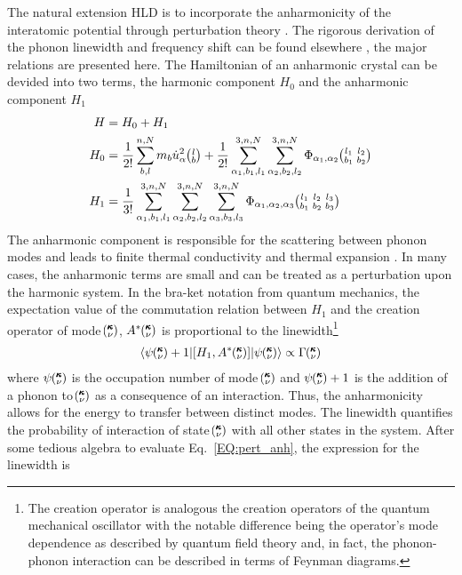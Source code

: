 The natural extension HLD is to incorporate the anharmonicity of the interatomic potential through perturbation theory \cite{turneythesis}. The rigorous derivation of the phonon linewidth and frequency shift can be found elsewhere \cite{PhysRev.128.2589}, the major relations are presented here. The Hamiltonian of an anharmonic crystal can be devided into two terms, the harmonic component $H_0$ and the anharmonic component $H_1$
%
\begin{equation}\label{EQ:H_anh}
\begin{split}
H&=H_0+H_1\\
H_0&=\frac{1}{2!}\sum_{b,l}^{n,N}m_b\dot{u}_\alpha^2 \lb + \frac{1}{2!}\sum_{\alpha_1,b_1,l_1}^{3,n,N}\sum_{\alpha_2,b_2,l_2}^{3,n,N}\Phi_{\alpha_1,\alpha_2} \lblb\\
H_1&=\frac{1}{3!}\sum_{\alpha_1,b_1,l_1}^{3,n,N}\sum_{\alpha_2,b_2,l_2}^{3,n,N}\sum_{\alpha_3,b_3,l_3}^{3,n,N}\Phi_{\alpha_1,\alpha_2,\alpha_3} \lblblb\\
\end{split}
\end{equation}
%
The anharmonic component is responsible for the scattering between phonon modes and leads to finite thermal conductivity and thermal expansion \cite{srivastava1990physics}. In many cases, the anharmonic terms are small and can be treated as a perturbation upon the harmonic system. In the bra-ket notation from quantum mechanics, the expectation value of the commutation relation between $H_1$ and the creation operator of mode $\mspace{-4.0mu}\left(\mspace{-8.0mu} \begin{smallmatrix}&\pmb{\kappa} \\&\nu\end{smallmatrix} \mspace{-3.0mu}\right)$, $A^*\mspace{-4.0mu}\left(\mspace{-8.0mu} \begin{smallmatrix}&\pmb{\kappa} \\&\nu\end{smallmatrix} \mspace{-3.0mu}\right)$ is proportional to the linewidth\footnote{The creation operator is analogous the creation operators of the quantum mechanical oscillator with the notable difference being the operator's mode dependence as described by quantum field theory and, in fact, the phonon-phonon interaction can be described in terms of Feynman diagrams.}
%
\begin{equation}\label{EQ:pert_anh}
\begin{split}
\langle \psi \kv+1 | [H_1,A^*\kv] | \psi \kv\rangle \propto \Gamma \kv
\end{split}
\end{equation}
%
where $\psi \mspace{-4.0mu}\left(\mspace{-8.0mu} \begin{smallmatrix}&\pmb{\kappa} \\&\nu\end{smallmatrix} \mspace{-3.0mu}\right)$ is the occupation number of mode $\mspace{-4.0mu}\left(\mspace{-8.0mu} \begin{smallmatrix}&\pmb{\kappa} \\&\nu\end{smallmatrix} \mspace{-3.0mu}\right)$ and $\psi \mspace{-4.0mu}\left(\mspace{-8.0mu} \begin{smallmatrix}&\pmb{\kappa} \\&\nu\end{smallmatrix} \mspace{-3.0mu}\right)+1$ is the addition of a phonon to $\mspace{-4.0mu}\left(\mspace{-8.0mu} \begin{smallmatrix}&\pmb{\kappa} \\&\nu\end{smallmatrix} \mspace{-3.0mu}\right)$ as a consequence of an interaction. Thus, the anharmonicity allows for the energy to transfer between distinct modes. The linewidth quantifies the probability of interaction of state $\mspace{-4.0mu}\left(\mspace{-8.0mu} \begin{smallmatrix}&\pmb{\kappa} \\&\nu\end{smallmatrix} \mspace{-3.0mu}\right)$ with all other states in the system. After some tedious algebra to evaluate Eq.~\ref{EQ:pert_anh}, the expression for the linewidth is
